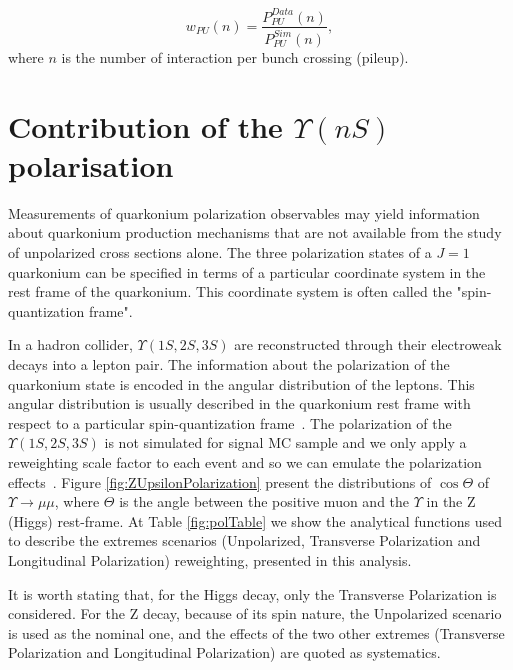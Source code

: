 \begin{equation}
\label{eqn:mc_weight}
w_{PU}(n) = \frac{P^{Data}_{PU}(n)}{P^{Sim}_{PU}(n)},
\end{equation}
where $n$ is the number of interaction per bunch crossing (pileup).

\section{Contribution of the \texorpdfstring{$\Upsilon(nS)$} p polarisation}
\label{sec:polarization}

Measurements of quarkonium polarization observables may yield information about quarkonium production mechanisms that are not available from the study of unpolarized cross sections alone. The three polarization states of a $J = 1$ quarkonium can be specified in terms of a particular coordinate system in the rest frame of the quarkonium. This coordinate system is often called the "spin-quantization frame". 

In a hadron collider, $\Upsilon(1S,2S,3S)$ are reconstructed through their electroweak decays into a lepton pair. The information about the polarization of the quarkonium state is encoded in the angular distribution of the leptons. This angular distribution is usually described in the quarkonium rest frame with respect to a particular spin-quantization frame~\cite{Brambilla:2011bph}. The polarization of the  $\Upsilon(1S,2S,3S)$ is not simulated for signal MC sample and we only apply a reweighting scale factor to each event and so we can emulate the polarization effects~\cite{PhysRevD.83.031503}. Figure \ref{fig:ZUpsilonPolarization} present the distributions of $\cos \Theta$ of $\Upsilon \rightarrow \mu\mu$, 
where $\Theta$ is the angle between the positive muon and the $\Upsilon$ in the Z (Higgs) rest-frame. At Table \ref{fig:polTable} we show the analytical functions used to describe the extremes scenarios (Unpolarized, Transverse Polarization and Longitudinal Polarization) reweighting, presented in this analysis. 

It is worth stating that, for the Higgs decay, only the Transverse Polarization is considered. For the Z decay, because of its spin nature, the Unpolarized scenario is used as the nominal one, and the effects of the two other extremes (Transverse Polarization and Longitudinal Polarization) are quoted as systematics.




